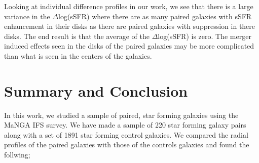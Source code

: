 \documentclass[iop,revtex4,twocolumn,apj,numberedappendix,appendixfloats]{emulateapj}
\begin{document}
Looking at individual difference profiles in our work, we see that there is a large variance in the $\Delta$log(sSFR) where there are as many paired galaxies with sSFR enhancement in their disks as there are paired galaxies with suppression in there disks. The end result is that the average of the $\Delta$log(sSFR) is zero. The merger induced effects seen in the disks of the paired galaxies may be more complicated than what is seen in the centers of the galaxies. 


\section{Summary and Conclusion}\label{sec:sum}

In this work, we studied a sample of paired, star forming galaxies using the MaNGA IFS survey. We have made a sample of 220 star forming galaxy pairs along with a set of 1891 star forming control galaxies. We compared the radial profiles of the paired galaxies with those of the controls galaxies and found the follwing;
\end{document}
